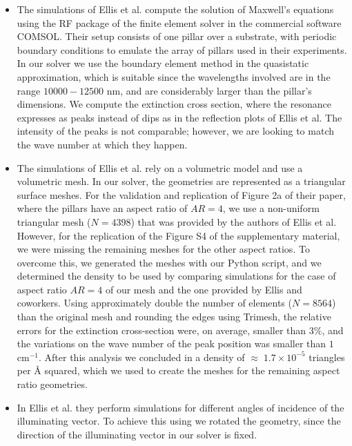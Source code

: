 \begin{itemize}

\item {The simulations of Ellis et al. compute the solution of Maxwell's equations using the RF package
of the finite element solver in the commercial software COMSOL. Their setup consists of one pillar over a 
substrate, with periodic boundary conditions to emulate the array of pillars used in their experiments. In our 
solver we use the boundary element method in the quasistatic approximation, which is suitable since the wavelengths
involved are in the range $10000-12500$ nm, and are considerably larger than the pillar's dimensions. We compute 
the extinction cross section, where the resonance expresses as peaks instead of dips as in the reflection plots of 
Ellis et al. The intensity of the peaks is not comparable; however, we are looking to match the wave number at which
they happen.}

\item {The simulations of Ellis et al. rely on a volumetric model and use a volumetric mesh. In our 
solver, the geometries are represented as a triangular surface meshes. For the validation and replication of Figure 2a of 
their paper, where the pillars have an aspect ratio of $AR=4$, we use a non-uniform triangular mesh ($N=4398$) that 
was provided by the authors of Ellis et al. However, for the replication of the Figure S4 of the supplementary material, 
we were missing the remaining meshes for the other aspect ratios. To overcome this, we generated the meshes with our Python 
script, and we determined the density to be used by comparing simulations for the case of aspect ratio $AR=4$ of our mesh and 
the one provided by Ellis and coworkers. Using approximately double the number of elements ($N=8564$) than the original mesh 
and rounding the edges using Trimesh, the relative errors for the extinction cross-section were, on average, smaller than 
$3\%$, and the variations on the wave number of the peak position was smaller than $1$ cm$^{-1}$. After this analysis we 
concluded in a density of $\approx \; 1.7 \times10^{-5}$ triangles per $\text{\AA}$ squared, which we used to create the meshes
for the remaining aspect ratio geometries.}

\item {In Ellis et al. they perform simulations for different angles of incidence of the illuminating vector. To achieve this 
using \pygbe we rotated the geometry, since the direction of the illuminating vector in our solver is fixed.}
\end{itemize}

